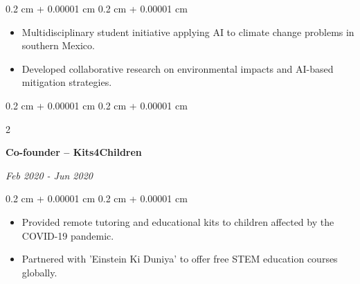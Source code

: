 \documentclass[10pt, letterpaper]{article}
\newenvironment{highlights}{
    \begin{itemize}[
        topsep=0.10 cm,
        parsep=0.10 cm,
        partopsep=0pt,
        itemsep=0pt,
        leftmargin=0.4 cm + 10pt
    ]
}{
    \end{itemize}
} %
\newenvironment{onecolentry}{
    \begin{adjustwidth}{
        0.2 cm + 0.00001 cm
    }{
        0.2 cm + 0.00001 cm
    }
}{
    \end{adjustwidth}
} %
\newenvironment{twocolentry}[2][]{
    \onecolentry
    \def\secondColumn{#2}
    \setcolumnwidth{\fill, 4.5 cm}
    \begin{paracol}{2}
}{
    \switchcolumn \raggedleft \secondColumn
    \end{paracol}
    \endonecolentry
} %
\begin{document}
\vspace{0.10 cm}
\begin{onecolentry}
    \begin{highlights}
        \item Multidisciplinary student initiative applying AI to climate change problems in southern Mexico.
        \item Developed collaborative research on environmental impacts and AI-based mitigation strategies.
    \end{highlights}
\end{onecolentry}
\begin{twocolentry}{
\textit{Feb 2020 - Jun 2020}}
    \textbf{Co-founder – Kits4Children}
\end{twocolentry}

\vspace{0.10 cm}
\begin{onecolentry}
    \begin{highlights}
        \item Provided remote tutoring and educational kits to children affected by the COVID-19 pandemic.
        \item Partnered with 'Einstein Ki Duniya' to offer free STEM education courses globally.
    \end{highlights}
\end{onecolentry}
\end{document}
